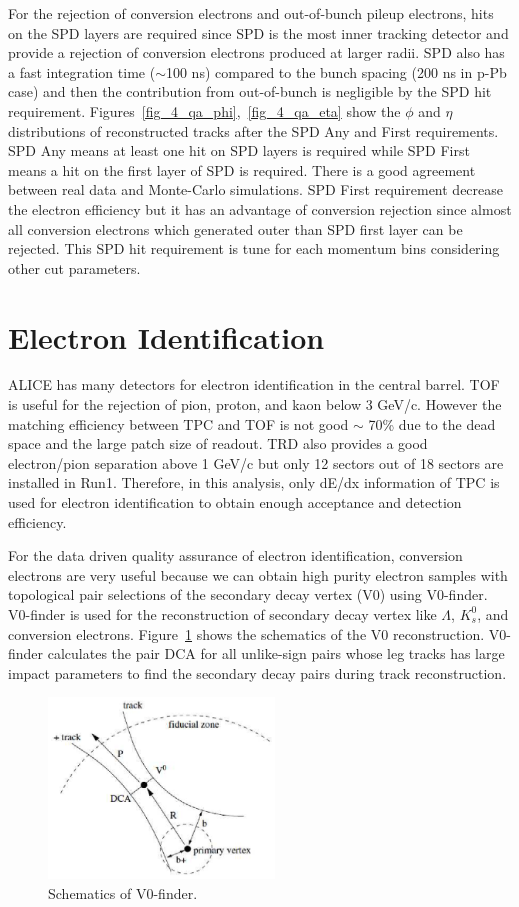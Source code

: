 For the rejection of conversion electrons and out-of-bunch pileup electrons, hits on the SPD layers are required since SPD is the most inner tracking detector and provide a rejection of conversion electrons produced at larger radii. 
SPD also has a fast integration time ($\sim$100 ns) compared to the bunch spacing (200 ns in p-Pb case) and then the contribution from out-of-bunch is negligible by the SPD hit requirement. 
Figures~\ref{fig_4_qa_phi},~\ref{fig_4_qa_eta} show the $\phi$ and $\eta$ distributions of reconstructed tracks after the SPD Any and First requirements. 
SPD Any means at least one hit on SPD layers is required while SPD First means a hit on the first layer of SPD is required. 
There is a good agreement between real data and Monte-Carlo simulations. 
SPD First requirement decrease the electron efficiency but it has an advantage of conversion rejection since almost all conversion electrons which generated outer than SPD first layer can be rejected. 
This SPD hit requirement is tune for each momentum bins considering other cut parameters. 

\section{Electron Identification}
\label{sec_4_eid}
ALICE has many detectors for electron identification in the central barrel.
TOF is useful for the rejection of pion, proton, and kaon below 3 GeV/c. However the matching efficiency between TPC and TOF is not good $\sim$ 70\% due to the dead space and the large patch size of readout. 
TRD also provides a good electron/pion separation above 1 GeV/c but only 12 sectors out of 18 sectors are installed in Run1. 
Therefore, in this analysis, only dE/dx information of TPC is used for electron identification to obtain enough acceptance and detection efficiency. 

For the data driven quality assurance of electron identification, conversion electrons are very useful because we can obtain high purity electron samples with topological pair selections of the secondary decay vertex (V0) using V0-finder. 
V0-finder is used for the reconstruction of secondary decay vertex like $\Lambda$, $K^{0}_{s}$, and conversion electrons. 
Figure~\ref{fig_4_v0finder} shows the schematics of the V0 reconstruction. 
V0-finder calculates the pair DCA for all unlike-sign pairs whose leg tracks has large impact parameters to find the secondary decay pairs during track reconstruction. 
\begin{figure}[!h]
  \centering
  \includegraphics[width=6cm]{chap4/figure/PID/v0-finder.eps}
  \caption{Schematics of V0-finder. }
  \label{fig_4_v0finder}
\end{figure}

